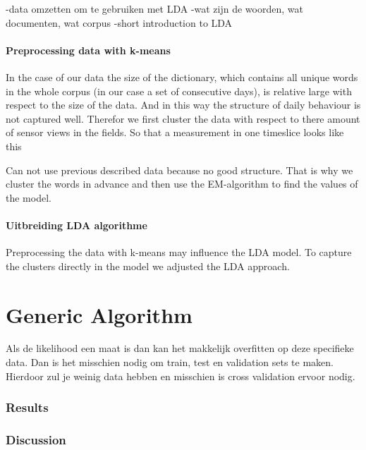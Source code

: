 \documentclass[11pt,a4paper]{report}
\begin{document}
-data omzetten om te gebruiken met LDA
-wat zijn de woorden, wat documenten, wat corpus
-short introduction to LDA

\subsection{Preprocessing data with k-means}
In the case of our data the size of the dictionary, which contains all unique words in the whole corpus (in our case a set of consecutive days), is relative large with respect to the size of the data. And in this way the structure of daily behaviour is not captured well.
Therefor we first cluster the data with respect to there amount of sensor views in the fields. So that a measurement in one timeslice looks like this


Can not use previous described data because no good structure. That is why we cluster the words in advance and then use the EM-algorithm to find the values of the model.



\subsection{Uitbreiding LDA algorithme}
Preprocessing the data with k-means may influence the LDA model. To capture the clusters directly in the model we adjusted the LDA approach. 

\part{Generic Algorithm}
Als de likelihood een maat is dan kan het makkelijk overfitten op deze specifieke data. Dan is het misschien nodig om train, test en validation sets te maken. Hierdoor zul je weinig data hebben en misschien is cross validation ervoor nodig.

\section{Results}


\section{Discussion}
\end{document}
